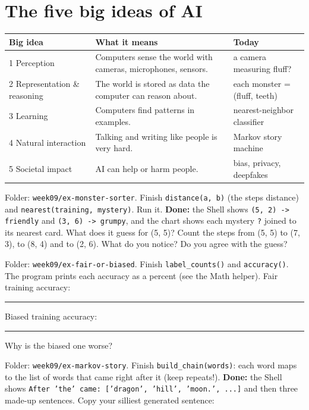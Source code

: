 \section{The five big ideas of AI}
\begin{center}\small
\begin{tabular}{@{}p{3.4cm}p{6cm}p{4.4cm}@{}}
\toprule
\textbf{Big idea} & \textbf{What it means} & \textbf{Today}\\ \midrule
1 Perception & Computers sense the world with cameras, microphones, sensors. & a camera measuring fluff?\\
2 Representation \& reasoning & The world is stored as data the computer can reason about. & each monster = (fluff, teeth)\\
3 Learning & Computers find patterns in examples. & nearest-neighbor classifier\\
4 Natural interaction & Talking and writing like people is very hard. & Markov story machine\\
5 Societal impact & AI can help or harm people. & bias, privacy, deepfakes\\
\bottomrule
\end{tabular}
\end{center}

\begin{exercise}
Folder: \texttt{week09/ex-monster-sorter}. Finish \texttt{distance(a, b)} (the steps distance) and \texttt{nearest(training, mystery)}. Run it. \textbf{Done:} the Shell shows \texttt{(5, 2) -> friendly} and \texttt{(3, 6) -> grumpy}, and the chart shows each mystery \texttt{?} joined to its nearest card. What does it guess for (5, 5)? Count the steps from (5, 5) to (7, 3), to (8, 4) and to (2, 6). What do you notice? Do you agree with the guess? 
\end{exercise}

\begin{exercise}
Folder: \texttt{week09/ex-fair-or-biased}. Finish \texttt{label\_counts()} and \texttt{accuracy()}. The program prints each accuracy as a percent (see the Math helper).
Fair training accuracy: \rule{1.5cm}{0.4pt} \quad Biased training accuracy: \rule{1.5cm}{0.4pt}
Why is the biased one worse? 
\end{exercise}

\begin{exercise}
Folder: \texttt{week09/ex-markov-story}. Finish \texttt{build\_chain(words)}: each word maps to the list of words that came right after it (keep repeats!). \textbf{Done:} the Shell shows \texttt{After 'the' came: ['dragon', 'hill', 'moon.', ...]} and then three made-up sentences. Copy your silliest generated sentence: 
\end{exercise}

